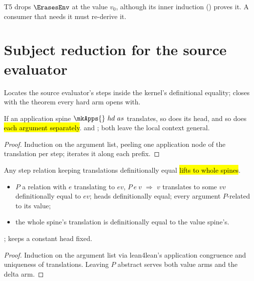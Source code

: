 \begin{remark}
 T5 drops $\ErasesEnv$ at the value $v_0$, although its inner induction ()
proves it. A consumer that needs it must re-derive it.
\end{remark}

\section{Subject reduction for the source evaluator}
\label{sec:correctness:subject}

Locates the source evaluator's steps inside the kernel's definitional equality; closes with the theorem
every hard arm opens with.

\begin{lemma}
\label{lem:trExprS_spine_head}
\leanok
{}
 If an application spine $\mkApps{}\ hd\ as$ translates, so does its head, and so does
\hl{each argument separately}.
  and ; both leave the local context general.
\end{lemma}
\begin{proof}
\leanok
{}
 Induction on the argument list, peeling one application node of the translation per step;
 iterates it along each prefix.
\end{proof}

\begin{lemma}
\label{lem:SEval-defeq_spine}
\leanok
{}
 Any step relation keeping translations definitionally equal \hl{lifts to whole spines}.
\begin{itemize}
\item {} $P$ a relation with $e$ translating to $ev$, $P\ e\ v$ $\Rightarrow$ $v$ translates to
some $vv$ definitionally equal to $ev$; heads definitionally equal; every argument $P$-related to its
value;
\item {} the whole spine's translation is definitionally equal to the value spine's.
\end{itemize}
 ;  keeps a constant head fixed.
\end{lemma}
\begin{proof}
\leanok
{}
 Induction on the argument list via lean4lean's application congruence and uniqueness of
translations. Leaving $P$ abstract serves both value arms and the delta arm.
\end{proof}

